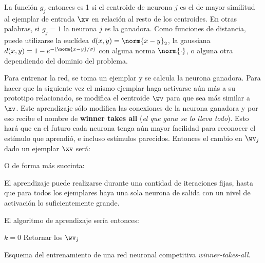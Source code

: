 
La función $g_j$ entonces es 1 si el centroide de neurona $j$ es el de mayor similitud al ejemplar de entrada $\xv$ en relación al resto de los centroides. En otras palabras, si $g_j=1$ la neurona $j$ es la ganadora. Como funciones de distancia, puede utilizarse la euclídea $d(x,y)=\norm{x-y}_2$, la gaussiana $d(x,y)=1-e^{-(\norm{x-y}/\sigma)}$ con alguna norma $\norm{\cdot}$, o alguna otra dependiendo del dominio del problema.

 
Para entrenar la red, se toma un ejemplar y se calcula la neurona ganadora. Para hacer que la siguiente vez el mismo ejemplar haga activarse aún más a su prototipo relacionado, se modifica el centroide $\wv$ para que sea más similar a $\xv$. Este aprendizaje sólo modifica las conexiones de la neurona ganadora y por eso recibe el nombre de  \textbf{winner takes all} (\textit{el que gana se lo lleva todo}). Esto hará que en el futuro cada neurona tenga aún mayor facilidad para reconocer el estímulo que aprendió, e incluso estímulos parecidos. Entonces el cambio en $\wv_j$ dado un ejemplar $\xv$ será:


O de forma más succinta:



El aprendizaje puede realizarse durante una cantidad de iteraciones fijas, hasta que para todos los ejemplares haya una sola neurona de salida con un nivel de activación lo suficientemente grande. 

El algoritmo de aprendizaje sería entonces:


\begin{algorithm}[H]
$k=0$ \;
Retornar los $\wv_j$ \;
\caption{Esquema del entrenamiento de una red neuronal competitiva \textit{winner-takes-all}.} 
\end{algorithm}
\vspace{10pt}


